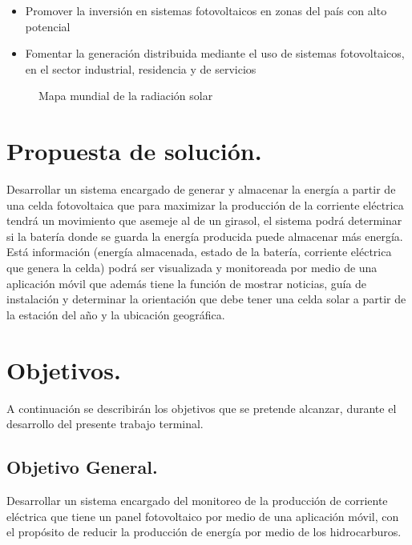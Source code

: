 \begin{itemize}
    \item Promover la inversión en sistemas fotovoltaicos en zonas del país con alto potencial
    \item Fomentar la generación distribuida mediante el uso de sistemas fotovoltaicos, en el sector industrial, residencia y de servicios
\end{itemize}

\begin{figure}[H]
\centering
\caption{Mapa mundial de la radiación solar}
\label{fig:1-1-1}
\end{figure}


\section{Propuesta de solución. }

Desarrollar un sistema encargado de generar y almacenar la energía a partir de una celda fotovoltaica que para maximizar la producción de la corriente eléctrica tendrá un movimiento que asemeje al de un girasol, el sistema podrá determinar si la batería donde se guarda la energía producida puede almacenar más energía. Está información (energía almacenada, estado de la batería, corriente eléctrica que genera la celda) podrá ser visualizada y monitoreada por medio de una aplicación móvil que además tiene la función de mostrar noticias, guía de instalación y determinar la orientación que debe tener una celda solar a partir de la estación del año y la ubicación geográfica.





\section{Objetivos. } %
A continuaci\'on se describir\'an los objetivos que se pretende alcanzar, durante el desarrollo del presente trabajo terminal. 

\subsection{Objetivo General.} %
Desarrollar un sistema encargado del monitoreo de la producción de corriente eléctrica que tiene un panel fotovoltaico por
medio de una aplicación móvil, con el propósito de reducir la producción de energía por medio de los hidrocarburos.
